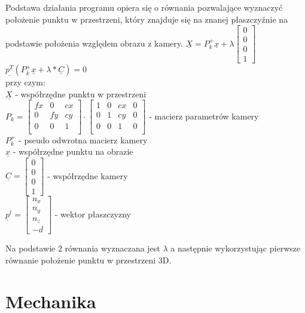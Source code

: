 \documentclass[conference]{IEEEtran}
\begin{document}
Podstawa działania programu opiera się o równania pozwalające wyznaczyć położenie punktu w przestrzeni, który znajduje się na znanej płaszczyźnie na podstawie położenia względem obrazu z kamery.
$\underline{X}={P_k^+}\underline{x}+\lambda 
\begin{bmatrix}
    0\\
    0\\
	0\\
    1
\end{bmatrix}$\\
$\underline{p^T}({P_k^+}\underline{x}+\lambda*\underline{C})=0$
\\
przy czym:
\\
$\underline{X}$ - współrzędne punktu w przestrzeni\\
$P_k=
\begin{bmatrix}
    fx&0&cx\\
    0&fy&cy\\
	0&0&1\\
\end{bmatrix}\cdot
\begin{bmatrix}
    1&0&cx&0\\
    0&1&cy&0\\
	0&0&1&0\\
\end{bmatrix}$ - macierz parametrów kamery\\
${P_k^+}$ - pseudo odwrotna macierz kamery\\
$\underline{x}$ - współrzędne punktu na obrazie\\
$\underline{C}=
\begin{bmatrix}
    0\\
    0\\
	0\\
    1
\end{bmatrix}$ - współrzędne kamery\\
$\underline{p}^t = 
\begin{bmatrix}
    n_x\\
    n_y\\
	n_z\\
    -d
\end{bmatrix}$ - wektor płaszczyzny

Na podstawie 2 równania wyznaczana jest $\lambda$ a następnie wykorzystując pierwsze równanie położenie punktu w przestrzeni 3D.

\section{Mechanika}
\end{document}
